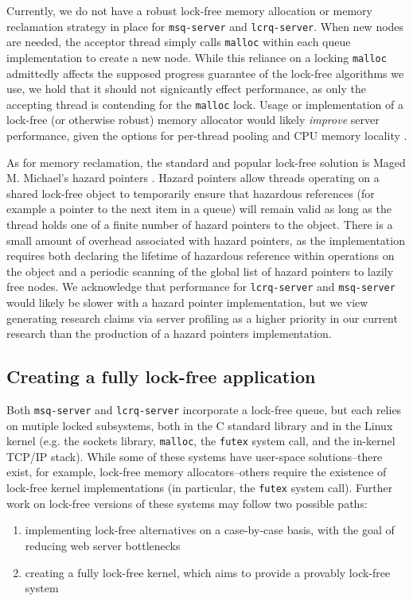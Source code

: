 \documentclass[twoside,10pt]{article}
\begin{document}
\begin{multicols}{2}
Currently, we do not have a robust lock-free memory allocation or
memory reclamation strategy in place for \verb+msq-server+ and
\verb+lcrq-server+. When new nodes are needed, the acceptor thread
simply calls \verb+malloc+ within each queue implementation to create
a new node. While this reliance on a locking \verb+malloc+ admittedly
affects the supposed progress guarantee of the lock-free algorithms we
use, we hold that it should not signicantly effect performance, as
only the accepting thread is contending for the \verb+malloc+
lock. Usage or implementation of a lock-free (or otherwise robust)
memory allocator would likely \emph{improve} server performance, given the
options for per-thread pooling and CPU memory locality
\cite{hart2007performance}.

As for memory reclamation, the standard and popular lock-free solution
is Maged M. Michael's hazard pointers \cite{michael2004hazard}. Hazard
pointers allow threads operating on a shared lock-free object to
temporarily ensure that hazardous references (for example a pointer to
the next item in a queue) will remain valid as long as the thread
holds one of a finite number of hazard pointers to the object. There
is a small amount of overhead associated with hazard pointers, as the
implementation requires both declaring the lifetime of hazardous
reference within operations on the object and a periodic scanning of
the global list of hazard pointers to lazily free nodes. We
acknowledge that performance for \verb+lcrq-server+ and
\verb+msq-server+ would likely be slower with a hazard pointer
implementation, but we view generating research claims via server
profiling as a higher priority in our current research than the
production of a hazard pointers implementation.

\subsection{Creating a fully lock-free application}

Both \verb+msq-server+ and \verb+lcrq-server+ incorporate a lock-free
queue, but each relies on mutiple locked subsystems, both in the C
standard library and in the Linux kernel (e.g. the sockets library,
\verb+malloc+, the \verb+futex+ system call, and the in-kernel TCP/IP
stack). While some of these systems have user-space solutions\---there
exist, for example, lock-free memory allocators\---others require the
existence of lock-free kernel implementations (in particular, the
\verb+futex+ system call). Further work on lock-free versions of these
systems may follow two possible paths:
\begin{enumerate}
\item implementing lock-free alternatives on a case-by-case basis,
  with the goal of reducing web server bottlenecks 
\item creating a fully lock-free kernel, which aims to provide a
  provably lock-free system
\end{enumerate}


\end{multicols}
\end{document}
